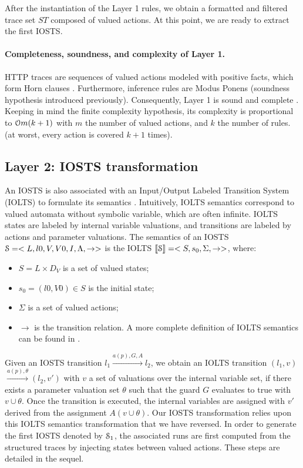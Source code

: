 After the instantiation of the Layer 1 rules, we obtain a
formatted and filtered trace set $ST$ composed of valued actions.
At this point, we are ready to extract the first IOSTS.

\paragraph{Completeness, soundness, and complexity of Layer 1.}
HTTP traces are sequences of valued actions modeled with positive
facts, which form Horn clauses \cite{JSL:9106942}.  Furthermore,
inference rules are Modus Ponens (soundness hypothesis introduced
previously).  Consequently, Layer 1 is sound and complete
\cite{logicreasoning}.  Keeping in mind the finite complexity
hypothesis, its complexity is proportional to
$\EuScript{O}m(k+1)$ with $m$ the number of valued actions, and
$k$ the number of rules. (at worst, every action is covered $k+1$
times).

\subsection{Layer 2: IOSTS transformation}
\label{sec:modelinf:webapps:L2}

An IOSTS is also associated with an Input/Output Labeled
Transition System (IOLTS) to formulate its semantics
\cite{rusu2005automatic}.  Intuitively, IOLTS semantics
correspond to valued automata without symbolic variable, which
are often infinite. IOLTS states are labeled by internal variable
valuations, and transitions are labeled by actions and parameter
valuations. The semantics of an IOSTS
$\EuScript{S}=<L,l0,V,V0,I,\Lambda,\rightarrow>$ is the IOLTS
$\llbracket \EuScript{S}\rrbracket = <S,s_0,\Sigma,\rightarrow>$,
where:

\begin{itemize}
    \item $S = L \times D_V$ is a set of valued states;

    \item $s_0=(l0,V0) \in S$ is the initial state;

    \item $\Sigma$ is a set of valued actions;

    \item $\rightarrow$ is the transition relation. A more
        complete definition of IOLTS semantics can be found in
        \cite{FTW05}.
\end{itemize}

Given an IOSTS transition $l_1 \xrightarrow{a(p),G,A}l_2$, we
obtain an IOLTS transition $(l_1,v)$ $\xrightarrow{a(p),\theta}
(l_2,v')$ with $v$ a set of valuations over the internal variable
set, if there exists a parameter valuation set $\theta$ such that
the guard $G$ evaluates to true with $v \cup \theta$. Once the
transition is executed, the internal variables are assigned with
$v'$ derived from the assignment $A(v \cup \theta)$.
Our IOSTS transformation relies upon this IOLTS semantics
transformation that we have reversed.  In order to generate the
first IOSTS denoted by $\EuScript{S}_1$, the associated runs are
first computed from the structured traces by injecting states
between valued actions. These steps are detailed in the
sequel.

